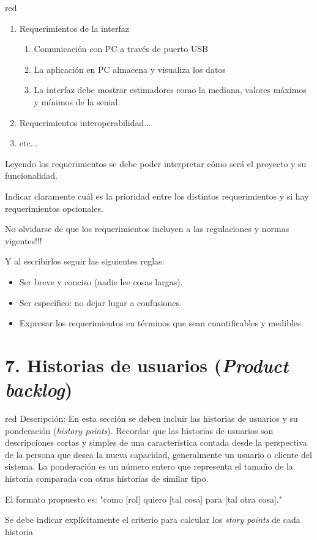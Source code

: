 \documentclass[
11pt, %
codirector, %
]{charter}
\begin{document}
\begin{consigna}{red}
\begin{enumerate}
	\item Requerimientos de la interfaz
	\begin{enumerate}
			\item Comunicación con PC a través de puerto USB
			\item La aplicación en PC almacena y visualiza los datos
			\item La interfaz debe mostrar estimadores como la mediana, valores máximos y mínimos de la senial.
		\end{enumerate}
	
	\item Requerimientos interoperabilidad...
	\item etc...
\end{enumerate}

Leyendo los requerimientos se debe poder interpretar cómo será el proyecto y su funcionalidad.

Indicar claramente cuál es la prioridad entre los distintos requerimientos y si hay requerimientos opcionales. 

No olvidarse de que los requerimientos incluyen a las regulaciones y normas vigentes!!!

Y al escribirlos seguir las siguientes reglas:
\begin{itemize}
	\item Ser breve y conciso (nadie lee cosas largas). 
	\item Ser específico: no dejar lugar a confusiones.
	\item Expresar los requerimientos en términos que sean cuantificables y medibles.
\end{itemize}

\end{consigna}

\section{7. Historias de usuarios (\textit{Product backlog})}
\label{sec:backlog}

\begin{consigna}{red}
Descripción: En esta sección se deben incluir las historias de usuarios y su ponderación (\textit{history points}). Recordar que las historias de usuarios son descripciones cortas y simples de una característica contada desde la perspectiva de la persona que desea la nueva capacidad, generalmente un usuario o cliente del sistema. La ponderación es un número entero que representa el tamaño de la historia comparada con otras historias de similar tipo.

El formato propuesto es: "como [rol] quiero [tal cosa] para [tal otra cosa]."

Se debe indicar explícitamente el criterio para calcular los \textit{story points} de cada historia
\end{consigna}
\end{document}
